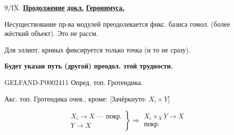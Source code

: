 


$9/\underline{\overline{\mathrm{IX}}}$.
\underline{\textbf{Продолжение}} \underline{\textbf{докл.}} \underline{\textbf{Геронимуса.}}



Несуществование пр-ва модулей преодолевается фикс. базиса гомол. (более жёсткий объект). Это не рассм.



Для эллипт. кривых фиксируется только точка (и то не сразу).



\textbf{Будет указан путь (другой) преодол. этой трудности.}



\begin{GelfandAdjacentEvidence}{GELFAND-P000241}{1}
Опред. топ. Гротендика.




\end{GelfandAdjacentEvidence}

Акс. топ. Гротендика очев., кроме: [Зачёркнуто: $X_i\times Y$]



\begin{equation*}
\left.\begin{gathered}X_i\longrightarrow X\text{ — покр.}\\Y\longrightarrow X\end{gathered}\right\}
\Rightarrow\begin{gathered}X_i\times_X Y\longrightarrow X\\\text{покр.}\end{gathered}
\end{equation*}



